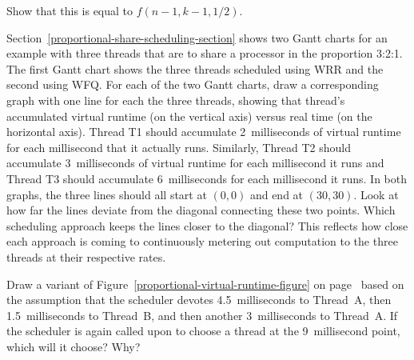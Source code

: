 \begin{chapterEnumerate}
\begin{enumerate}
Show that this is equal to $f(n-1,k-1,1/2)$.
\end{enumerate}
\item\label{WRR-WFQ-comparison-exercise}
Section~\ref{proportional-share-scheduling-section} shows two Gantt charts for an example
with three threads that are to share a processor in the proportion 3:2:1.  The first Gantt chart shows the three threads scheduled using WRR and the second using WFQ.  For each of the two Gantt charts, draw a corresponding graph with one line for each the three threads, showing that thread's accumulated virtual runtime (on the vertical axis) versus real time (on the horizontal axis).  Thread T1 should accumulate 2~milliseconds of virtual runtime for each millisecond that it actually runs.  Similarly, Thread T2 should accumulate 3~milliseconds of virtual runtime for each millisecond it runs and Thread T3 should accumulate 6~milliseconds for each millisecond it runs.  In both graphs, the three lines should all start at $(0,0)$ and end at $(30,30)$.  Look at how far the lines deviate from the diagonal connecting these two points.  Which scheduling approach keeps the lines closer to the diagonal?  This reflects how close each approach is coming to continuously metering out computation to the three threads at their respective rates.
\item
Draw a variant of Figure~\ref{proportional-virtual-runtime-figure} on page~\pageref{proportional-virtual-runtime-figure}
based on the assumption that the scheduler devotes 4.5~milliseconds to Thread~A, then 1.5~milliseconds to Thread~B, and then
another 3~milliseconds to Thread~A.  If the scheduler is again called upon to choose a thread at the 9~millisecond point,
which will it choose?  Why?
\end{chapterEnumerate}


